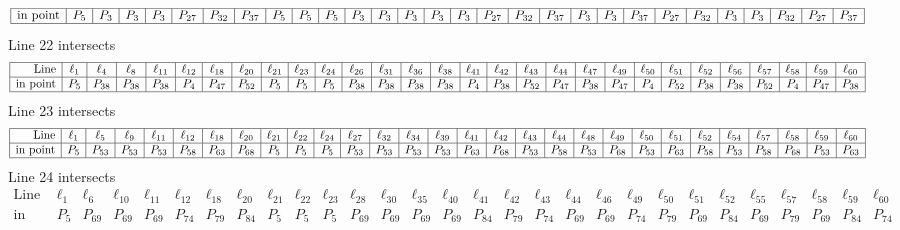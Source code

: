\documentclass{article}
\begin{document}
{$$\begin{array}{|r*{28}{|c}|}
\hline
\mbox{in point}  & P_{5} & P_{3} & P_{3} & P_{3} & P_{27} & P_{32} & P_{37} & P_{5} & P_{5} & P_{5} & P_{3} & P_{3} & P_{3} & P_{3} & P_{3} & P_{27} & P_{32} & P_{37} & P_{3} & P_{3} & P_{37} & P_{27} & P_{32} & P_{3} & P_{3} & P_{32} & P_{27} & P_{37}\\
\hline
\end{array}
$$
Line 22 intersects 
$$
\begin{array}{|r*{28}{|c}|}
\hline
\mbox{Line}  & \ell_{1} & \ell_{4} & \ell_{8} & \ell_{11} & \ell_{12} & \ell_{18} & \ell_{20} & \ell_{21} & \ell_{23} & \ell_{24} & \ell_{26} & \ell_{31} & \ell_{36} & \ell_{38} & \ell_{41} & \ell_{42} & \ell_{43} & \ell_{44} & \ell_{47} & \ell_{49} & \ell_{50} & \ell_{51} & \ell_{52} & \ell_{56} & \ell_{57} & \ell_{58} & \ell_{59} & \ell_{60}\\
\hline
\mbox{in point}  & P_{5} & P_{38} & P_{38} & P_{38} & P_{4} & P_{47} & P_{52} & P_{5} & P_{5} & P_{5} & P_{38} & P_{38} & P_{38} & P_{38} & P_{4} & P_{38} & P_{52} & P_{47} & P_{38} & P_{47} & P_{4} & P_{52} & P_{38} & P_{38} & P_{52} & P_{4} & P_{47} & P_{38}\\
\hline
\end{array}
$$
Line 23 intersects 
$$
\begin{array}{|r*{28}{|c}|}
\hline
\mbox{Line}  & \ell_{1} & \ell_{5} & \ell_{9} & \ell_{11} & \ell_{12} & \ell_{18} & \ell_{20} & \ell_{21} & \ell_{22} & \ell_{24} & \ell_{27} & \ell_{32} & \ell_{34} & \ell_{39} & \ell_{41} & \ell_{42} & \ell_{43} & \ell_{44} & \ell_{48} & \ell_{49} & \ell_{50} & \ell_{51} & \ell_{52} & \ell_{54} & \ell_{57} & \ell_{58} & \ell_{59} & \ell_{60}\\
\hline
\mbox{in point}  & P_{5} & P_{53} & P_{53} & P_{53} & P_{58} & P_{63} & P_{68} & P_{5} & P_{5} & P_{5} & P_{53} & P_{53} & P_{53} & P_{53} & P_{63} & P_{68} & P_{53} & P_{58} & P_{53} & P_{68} & P_{53} & P_{63} & P_{58} & P_{53} & P_{58} & P_{68} & P_{53} & P_{63}\\
\hline
\end{array}
$$
Line 24 intersects 
$$
\begin{array}{|r*{28}{|c}|}
\hline
\mbox{Line}  & \ell_{1} & \ell_{6} & \ell_{10} & \ell_{11} & \ell_{12} & \ell_{18} & \ell_{20} & \ell_{21} & \ell_{22} & \ell_{23} & \ell_{28} & \ell_{30} & \ell_{35} & \ell_{40} & \ell_{41} & \ell_{42} & \ell_{43} & \ell_{44} & \ell_{46} & \ell_{49} & \ell_{50} & \ell_{51} & \ell_{52} & \ell_{55} & \ell_{57} & \ell_{58} & \ell_{59} & \ell_{60}\\
\hline
\mbox{in point}  & P_{5} & P_{69} & P_{69} & P_{69} & P_{74} & P_{79} & P_{84} & P_{5} & P_{5} & P_{5} & P_{69} & P_{69} & P_{69} & P_{69} & P_{84} & P_{79} & P_{74} & P_{69} & P_{69} & P_{74} & P_{79} & P_{69} & P_{84} & P_{69} & P_{79} & P_{69} & P_{84} & P_{74}\\

\end{array}$$}
\end{document}
